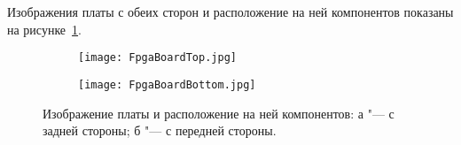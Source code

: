 Изображения платы с обеих сторон и расположение на ней компонентов показаны на рисунке~\ref{fig:FpgaBoard}.

\begin{figure}[ht]
\centering
  \begin{subfigure}[b]{1\textwidth} 
    \centering
    \texttt{[image: FpgaBoardTop.jpg]}  
    \caption{}
  \end{subfigure}
  \begin{subfigure}[b]{1\textwidth} 
    \centering
    \texttt{[image: FpgaBoardBottom.jpg]}  
    \caption{}
  \end{subfigure}
  \caption{ Изображение платы \boardname{} и расположение на ней компонентов:
			а "--- с задней стороны;
			б "--- с передней стороны.}
  \label{fig:FpgaBoard}
\end{figure}
